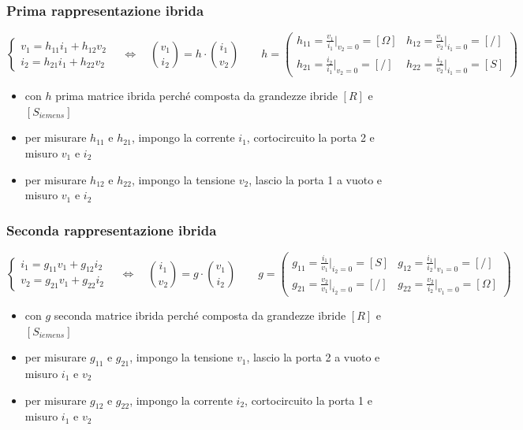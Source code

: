 \documentclass[a4paper]{article}
\begin{document}
\subsubsection*{Prima rappresentazione ibrida}
\[\begin{cases}
	v_1 = h_{11} i_1 + h_{12} v_2 \\
	i_2 = h_{21} i_1 + h_{22} v_2
\end{cases} \quad \Leftrightarrow \quad
\binom{v_1}{i_2} = h \cdot \binom{i_1}{v_2} \qquad
h = \left( \begin{matrix}
	h_{11} = \frac{v_1}{i_1} \Big|_{v_2=0} = [\Omega] & h_{12} = \frac{v_1}{v_2} \Big|_{i_1=0} = [/] \\[8pt]
	h_{21} = \frac{i_2}{i_1} \Big|_{v_2=0} = [/] & h_{22} = \frac{i_2}{v_2} \Big|_{i_1=0} = [S]
\end{matrix} \right)\]
\begin{itemize}
	\item con \(h\) prima matrice ibrida perché composta da grandezze ibride \([R]\) e \([S_{iemens}]\)
	\item per misurare \(h_{11}\) e \(h_{21}\), impongo la corrente \(i_1\), cortocircuito la porta 2 e misuro \(v_1\) e \(i_2\)
	\item per misurare \(h_{12}\) e \(h_{22}\), impongo la tensione \(v_2\), lascio la porta 1 a vuoto e misuro \(v_1\) e \(i_2\)
\end{itemize}

\subsubsection*{Seconda rappresentazione ibrida}
\[\begin{cases}
	i_1 = g_{11} v_1 + g_{12} i_2 \\
	v_2 = g_{21} v_1 + g_{22} i_2
\end{cases} \quad \Leftrightarrow \quad
\binom{i_1}{v_2} = g \cdot \binom{v_1}{i_2} \qquad
g = \left( \begin{matrix}
	g_{11} = \frac{i_1}{v_1} \Big|_{i_2=0} = [S] & g_{12} = \frac{i_1}{i_2} \Big|_{v_1=0} = [/] \\[8pt]
	g_{21} = \frac{v_2}{v_1} \Big|_{i_2=0} = [/] & g_{22} = \frac{v_2}{i_2} \Big|_{v_1=0} = [\Omega]
\end{matrix} \right)\]
\begin{itemize}
	\item con \(g\) seconda matrice ibrida perché composta da grandezze ibride \([R]\) e \([S_{iemens}]\)
	\item per misurare \(g_{11}\) e \(g_{21}\), impongo la tensione \(v_1\), lascio la porta 2 a vuoto e misuro \(i_1\) e \(v_2\)
	\item per misurare \(g_{12}\) e \(g_{22}\), impongo la corrente \(i_2\), cortocircuito la porta 1 e misuro \(i_1\) e \(v_2\)
\end{itemize}
\end{document}
